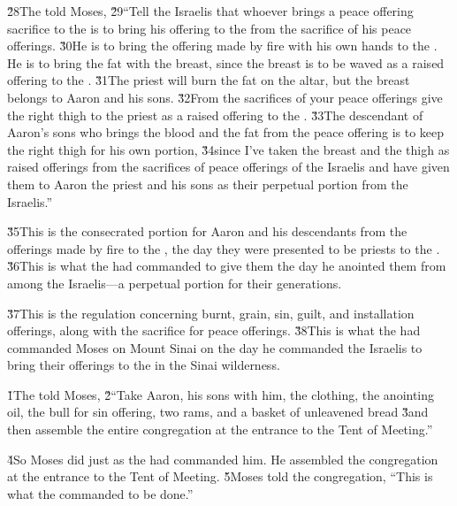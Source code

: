 \v{28}The  told Moses, \v{29}``Tell the Israelis that whoever brings a peace offering sacrifice to the  is to bring his offering to the  from the sacrifice of his peace offerings. \v{30}He is to bring the offering made by fire with his own hands to the . He is to bring the fat with the breast, since the breast is to be waved as a raised offering to the . \v{31}The priest will burn the fat on the altar, but the breast belongs to Aaron and his sons. \v{32}From the sacrifices of your peace offerings give the right thigh to the priest as a raised offering to the . \v{33}The descendant of Aaron's sons who brings the blood and the fat from the peace offering is to keep the right thigh for his own portion, \v{34}since I've taken the breast and the thigh as raised offerings from the sacrifices of peace offerings of the Israelis and have given them to Aaron the priest and his sons as their perpetual portion from the Israelis.''

\v{35}This is the consecrated portion for Aaron and his descendants from the offerings made by fire to the , the day they were presented to be priests to the . \v{36}This is what the  had commanded to give them the day he anointed them from among the Israelis---a perpetual portion for their generations.

\v{37}This is the regulation concerning burnt, grain, sin, guilt, and installation offerings, along with the sacrifice for peace offerings. \v{38}This is what the  had commanded Moses on Mount Sinai on the day he commanded the Israelis to bring their offerings to the  in the Sinai wilderness.

\v{1}The  told Moses, \v{2}``Take Aaron, his sons with him, the clothing, the anointing oil, the bull for sin offering, two rams, and a basket of unleavened bread \v{3}and then assemble the entire congregation at the entrance to the Tent of Meeting.''

\v{4}So Moses did just as the  had commanded him. He assembled the congregation at the entrance to the Tent of Meeting. \v{5}Moses told the congregation, ``This is what the  commanded to be done.''

